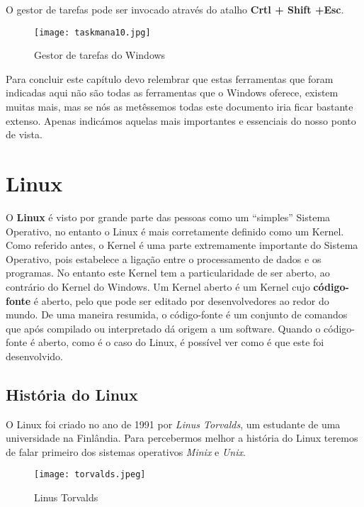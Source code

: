 \documentclass{report}
\begin{document}
\vspace{35mm}

O gestor de tarefas pode ser invocado através do atalho \textbf{Crtl + Shift +Esc}.

\vspace{10mm}

\begin{figure}[h!]
\texttt{[image: taskmana10.jpg]}
\centering
\caption{Gestor de tarefas do Windows}
\end{figure}

Para concluir este capítulo devo relembrar que estas ferramentas que foram indicadas aqui não são todas as ferramentas que o Windows oferece, existem muitas mais, mas se nós as metêssemos todas este documento iria ficar bastante extenso. 
Apenas indicámos aquelas mais importantes e essenciais do nosso ponto de vista.


\chapter{Linux}
\label{chap.linux}
O \textbf{Linux} é visto por grande parte das pessoas como um “simples” Sistema Operativo, no entanto o Linux é mais corretamente definido como um Kernel. Como referido antes, o Kernel é uma parte extremamente importante do Sistema Operativo, pois estabelece a ligação entre o processamento de dados e os programas.
No entanto este Kernel tem a particularidade de ser aberto, ao contrário do Kernel do Windows. Um Kernel aberto é um Kernel cujo \textbf{código-fonte} é aberto, pelo que pode ser editado por desenvolvedores ao redor do mundo. 
De uma maneira resumida, o código-fonte é um conjunto de comandos que após compilado ou interpretado dá origem a um software. Quando o código-fonte é aberto, como é o caso do Linux, é possível ver como é que este foi desenvolvido.

\section{História do Linux}

O Linux foi criado no ano de 1991 por \textit{Linus Torvalds}, um estudante de uma universidade na Finlândia. Para percebermos melhor a história do Linux teremos de falar primeiro dos sistemas operativos \textit{Minix} e \textit{Unix}.

\begin{figure}[h!]
    \centering
    \texttt{[image: torvalds.jpeg]}
    \caption{Linus Torvalds}
\end{figure}
\end{document}
